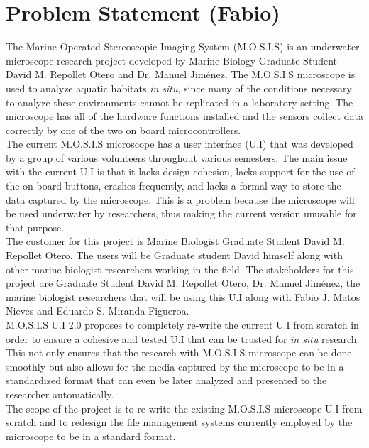  \section{Problem Statement (Fabio)}
 The Marine Operated Stereoscopic Imaging System (M.O.S.I.S) is an underwater microscope research project developed by Marine Biology Graduate Student David M. Repollet Otero and Dr. Manuel Jiménez\cite{fernandoguzman3UIMosis2023}\cite{Fabiomatos999}. The M.O.S.I.S microscope is used to analyze aquatic habitats \textit{in situ}, since many of the conditions necessary to analyze these environments cannot be replicated in a laboratory setting. The microscope has all of the hardware functions installed and the sensors collect data correctly by one of the two on board microcontrollers.\\ The current M.O.S.I.S microscope has a user interface (U.I) that was developed by a group of various volunteers throughout various semesters. The main issue with the current U.I is that it lacks design cohesion, lacks support for the use of the on board buttons, crashes frequently, and lacks a formal way to store the data captured by the microscope. This is a problem because the microscope will be used underwater by researchers, thus making the current version unusable for that purpose.\\
 The customer for this project is Marine Biologist Graduate Student David M. Repollet Otero. The users will be Graduate student David himself along with other marine biologist researchers working in the field. The stakeholders for this project are Graduate Student David M. Repollet Otero, Dr. Manuel Jiménez, the marine biologist researchers that will be using this U.I along with Fabio J. Matos Nieves and Eduardo S. Miranda Figueroa.\\
 M.O.S.I.S U.I 2.0 proposes to completely re-write the current U.I from scratch in order to ensure a cohesive and tested U.I that can be trusted for \textit{in situ} research. This not only ensures that the research with M.O.S.I.S microscope can be done smoothly but also allows for the media captured by the microscope to be in a standardized format that can even be later analyzed and presented to the researcher automatically.\\
The scope of the project is to re-write the existing M.O.S.I.S microscope U.I from scratch and to redesign the file management systems currently employed by the microscope to be in a standard format.